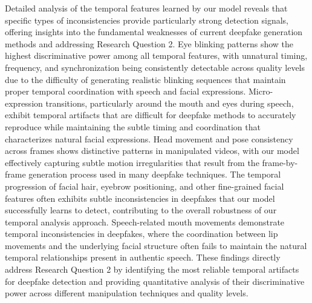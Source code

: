 \documentclass[conference]{IEEEtran}
\begin{document}
Detailed analysis of the temporal features learned by our model reveals that specific types of inconsistencies provide particularly strong detection signals, offering insights into the fundamental weaknesses of current deepfake generation methods and addressing Research Question 2.
Eye blinking patterns show the highest discriminative power among all temporal features, with unnatural timing, frequency, and synchronization being consistently detectable across quality levels due to the difficulty of generating realistic blinking sequences that maintain proper temporal coordination with speech and facial expressions.
Micro-expression transitions, particularly around the mouth and eyes during speech, exhibit temporal artifacts that are difficult for deepfake methods to accurately reproduce while maintaining the subtle timing and coordination that characterizes natural facial expressions.
Head movement and pose consistency across frames shows distinctive patterns in manipulated videos, with our model effectively capturing subtle motion irregularities that result from the frame-by-frame generation process used in many deepfake techniques.
The temporal progression of facial hair, eyebrow positioning, and other fine-grained facial features often exhibits subtle inconsistencies in deepfakes that our model successfully learns to detect, contributing to the overall robustness of our temporal analysis approach.
Speech-related mouth movements demonstrate temporal inconsistencies in deepfakes, where the coordination between lip movements and the underlying facial structure often fails to maintain the natural temporal relationships present in authentic speech.
These findings directly address Research Question 2 by identifying the most reliable temporal artifacts for deepfake detection and providing quantitative analysis of their discriminative power across different manipulation techniques and quality levels.
\end{document}
